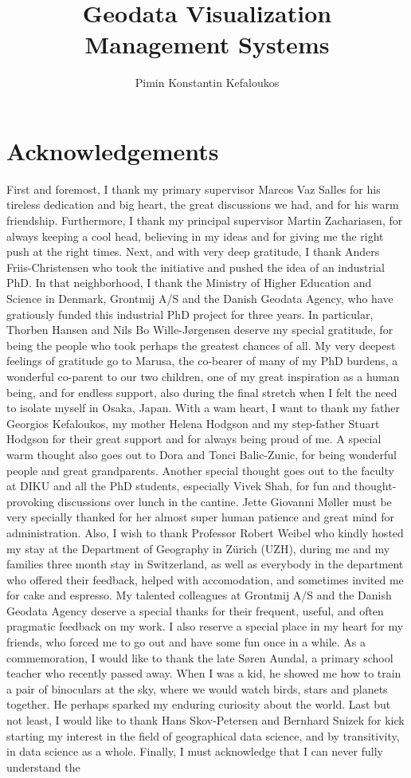 \documentclass[11pt, oneside]{report}
\title{Geodata Visualization Management Systems}
\author{Pimin Konstantin Kefaloukos}
\begin{document}
\maketitle

\section*{Acknowledgements}
First and foremost, I thank my primary supervisor Marcos Vaz Salles for his tireless dedication and big heart, the great discussions we had, and for his warm friendship. Furthermore, I thank my principal supervisor Martin Zachariasen, for always keeping a cool head, believing in my ideas and for giving me the right push at the right times. Next, and with very deep gratitude, I thank Anders Friis-Christensen who took the initiative and pushed the idea of an industrial PhD. In that neighborhood, I thank the Ministry of Higher Education and Science in Denmark, Grontmij A/S and the Danish Geodata Agency, who have gratiously funded this industrial PhD project for three years. In particular, Thorben Hansen and Nils Bo Wille-J{\o}rgensen deserve my special gratitude, for being the people who took perhaps the greatest chances of all. My very deepest feelings of gratitude go to Marusa, the co-bearer of many of my PhD burdens, a wonderful co-parent to our two children, one of my great inspiration as a human being, and for endless support, also during the final stretch when I felt the need to isolate myself in Osaka, Japan. With a wam heart, I want to thank my father Georgios Kefaloukos, my mother Helena Hodgson and my step-father Stuart Hodgson for their great support and for always being proud of me. A special warm thought also goes out to Dora and Tonci Balic-Zunic, for being wonderful people and great grandparents. Another special thought goes out to the faculty at DIKU and all the PhD students, especially Vivek Shah, for fun and thought-provoking discussions over lunch in the cantine. Jette Giovanni M{\o}ller must be very specially thanked for her almost super human patience and great mind for administration. Also, I wish to thank Professor Robert Weibel who kindly hosted my stay at the Department of Geography in Z{\"u}rich (UZH),  during me and my families three month stay in Switzerland, as well as everybody in the department who offered their feedback, helped with accomodation, and sometimes invited me for cake and espresso. My talented colleagues at Grontmij A/S and the Danish Geodata Agency deserve a special thanks for their frequent, useful, and often pragmatic feedback on my work. I also reserve a special place in my heart for my friends, who forced me to go out and have some fun once in a while. As a commemoration, I would like to thank the late S{\o}ren Aundal, a primary school teacher who recently passed away. When I was a kid, he showed me how to train a pair of binoculars at the sky, where we would watch birds, stars and planets together. He perhaps sparked my enduring curiosity about the world. Last but not least, I would like to thank Hans Skov-Petersen and Bernhard Snizek for kick starting my interest in the field of geographical data science, and by transitivity, in data science as a whole. Finally, I must acknowledge that I can never fully understand the 
\end{document}
